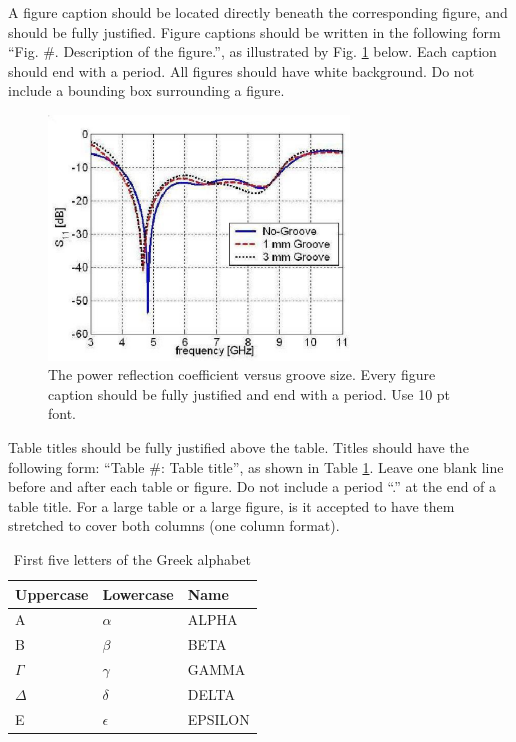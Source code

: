 \documentclass[letterpaper,twocolumn]{ACESJournal}
\newcommand{\red}[1]{{\color{red}#1}}
\begin{document}
\red{A figure caption should be located directly beneath the corresponding figure, and should be fully justified. Figure captions should be written in the following form ``Fig. \#. Description of the figure.'', as illustrated by Fig. \ref{fig:power_reflection} below. Each caption should end with a period.} All figures should have white background. Do not include a bounding box surrounding a figure.
%
\begin{figure}%
  \begin{center}
  \includegraphics[width=8cm]{pict/power_reflection}
  \caption{The power reflection coefficient versus groove size. \red{Every figure caption should be fully justified and end with a period. Use 10 pt font.}}
  \label{fig:power_reflection}
  \end{center}
\end{figure}
%

Table titles should be fully justified above the table. Titles should have the following form: ``Table \#: Table title'', as shown in Table \ref{tab:greek}. Leave one blank line before and after each table or figure. Do not include a period ``.'' at the end of a table title. For a large table or a large figure, is it accepted to have them stretched to cover both columns (one column format).
%
\begin{table}
\begin{center}
\caption{First five letters of the Greek alphabet}
\begin{tabularx}{\columnwidth}{X|X|X}
%
\hline
%
{\bf Uppercase} & {\bf Lowercase} & {\bf Name}\\
%
\hline
A & $\alpha$ & ALPHA\\
\hline
B & $\beta$ & BETA\\
\hline
$\Gamma$ & $\gamma$ & GAMMA\\
\hline
$\Delta$ & $\delta$ & DELTA\\
\hline
E & $\epsilon$ & EPSILON\\
\hline
%
\end{tabularx}
\label{tab:greek}
\end{center}
\end{table}
%
\end{document}

